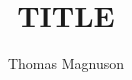 \documentclass[letterpaper,man,natbib]{apa6}
\title{TITLE}
\author{Thomas Magnuson}
\affiliation{University of Colorado, Boulder}
\begin{document}
\maketitle
\setlength{\parindent}{1.29cm}







\begin{hangparas}{1.29cm}{1}

\end{hangparas}
\end{document}
